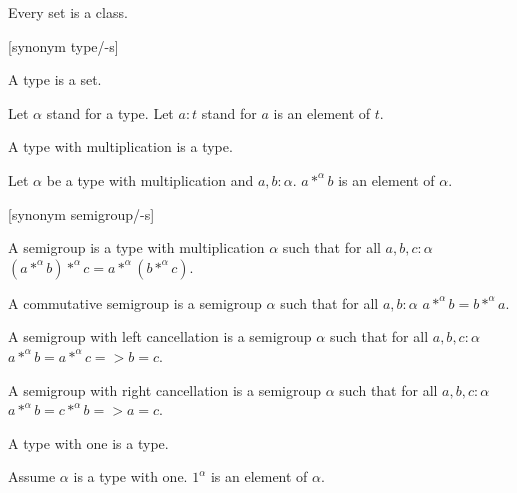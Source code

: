 \documentclass{article}
\begin{document}
\begin{forthel}

\begin{lemma}
Every set is a class.
\end{lemma}

[synonym type/-s]

\begin{signature}
A type is a set.
\end{signature}

Let $\alpha$ stand for a type.
Let $a : t$ stand for $a$ is an element of $t$.

\begin{signature}
A type with multiplication is a type.
\end{signature}

\begin{signature}
Let $\alpha$ be a type with multiplication and $a,b : \alpha$.
$a *^{\alpha} b$ is an element of $\alpha$.
\end{signature}

[synonym semigroup/-s]

\begin{definition}
A semigroup is a type with multiplication $\alpha$
such that for all $a,b,c : \alpha$
$(a *^{\alpha} b) *^{\alpha} c = a *^{\alpha} (b *^{\alpha} c)$.
\end{definition}

\begin{definition}
A commutative semigroup is a semigroup $\alpha$
such that for all $a,b : \alpha$
$a *^{\alpha} b = b *^{\alpha} a$.
\end{definition}

\begin{definition}
A semigroup with left cancellation is a semigroup
$\alpha$ such that for all $a,b,c : \alpha$
$a *^{\alpha} b = a *^{\alpha} c => b = c$.
\end{definition}

\begin{definition}
A semigroup with right cancellation is a semigroup
$\alpha$ such that for all $a,b,c : \alpha$
$a *^{\alpha} b = c *^{\alpha} b => a = c$.
\end{definition}

\begin{signature}
A type with one is a type.
\end{signature}

\begin{signature}
Assume $\alpha$ is a type with one. $1^{\alpha}$ is an
element of $\alpha$.
\end{signature}


\end{forthel}
\end{document}
